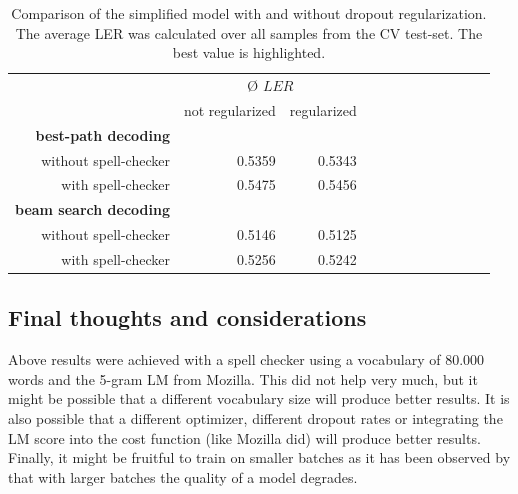 \begin{table}[h!]
	\centering
	\begin{tabular}{@{}rrrrcrrrcrrr@{}}\toprule
		& \multicolumn{2}{c}{Ø $LER$} \\
		\cmidrule{2-3}
		& not regularized & regularized\\ \midrule
		\textbf{best-path decoding}\\
		without spell-checker & 0.5359 & 0.5343 \\
		with spell-checker & 0.5475 & 0.5456 \\
		\textbf{beam search decoding}\\
		without spell-checker & 0.5146 & \cellcolor{green!25}0.5125 \\
		with spell-checker & 0.5256 & 0.5242 \\
		\bottomrule
	\end{tabular}
	\caption{Comparison of the simplified model with and without dropout regularization. The average \ac{LER} was calculated over all samples from the \ac{CV} test-set. The best value is highlighted.}
	\label{comparison_regularized_unregularized}
\end{table}



\subsection{Final thoughts and considerations}

Above results were achieved with a spell checker using a vocabulary of 80.000 words and the 5-gram \ac{LM} from Mozilla. This did not help very much, but it might be possible that a different vocabulary size will produce better results. It is also possible that a different optimizer, different dropout rates or integrating the \ac{LM} score into the cost function (like Mozilla did) will produce better results. Finally, it might be fruitful to train on smaller batches as it has been observed by \cite{batch_size_rnn} that with larger batches the quality of a model degrades. 

